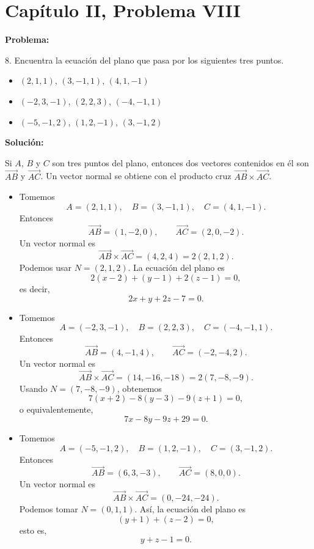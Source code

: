 \section*{Capítulo II, Problema VIII}

\textbf{Problema:}

8. Encuentra la ecuación del plano que pasa por los siguientes tres puntos.

\begin{itemize}
    \item[(a)] $(2,1,1)$, $(3,-1,1)$, $(4,1,-1)$
    \item[(b)] $(-2,3,-1)$, $(2,2,3)$, $(-4,-1,1)$
    \item[(c)] $(-5,-1,2)$, $(1,2,-1)$, $(3,-1,2)$
\end{itemize}

\textbf{Solución:}

Si $A$, $B$ y $C$ son tres puntos del plano, entonces dos vectores contenidos en él son $\overrightarrow{AB}$ y $\overrightarrow{AC}$. Un vector normal se obtiene con el producto cruz $\overrightarrow{AB} \times \overrightarrow{AC}$.

\begin{itemize}
    \item[(a)] Tomemos
    \[
        A=(2,1,1), \quad B=(3,-1,1), \quad C=(4,1,-1).
    \]
    Entonces
    \[
        \overrightarrow{AB} = (1,-2,0), \qquad \overrightarrow{AC} = (2,0,-2).
    \]
    Un vector normal es
    \[
        \overrightarrow{AB} \times \overrightarrow{AC} = (4,2,4) = 2(2,1,2).
    \]
    Podemos usar $N=(2,1,2)$. La ecuación del plano es
    \[
        2(x-2) + (y-1) + 2(z-1) = 0,
    \]
    es decir,
    \[
        2x + y + 2z - 7 = 0.
    \]

    \item[(b)] Tomemos
    \[
        A=(-2,3,-1), \quad B=(2,2,3), \quad C=(-4,-1,1).
    \]
    Entonces
    \[
        \overrightarrow{AB} = (4,-1,4), \qquad \overrightarrow{AC} = (-2,-4,2).
    \]
    Un vector normal es
    \[
        \overrightarrow{AB} \times \overrightarrow{AC} = (14,-16,-18) = 2(7,-8,-9).
    \]
    Usando $N=(7,-8,-9)$, obtenemos
    \[
        7(x+2) - 8(y-3) - 9(z+1) = 0,
    \]
    o equivalentemente,
    \[
        7x - 8y - 9z + 29 = 0.
    \]

    \item[(c)] Tomemos
    \[
        A=(-5,-1,2), \quad B=(1,2,-1), \quad C=(3,-1,2).
    \]
    Entonces
    \[
        \overrightarrow{AB} = (6,3,-3), \qquad \overrightarrow{AC} = (8,0,0).
    \]
    Un vector normal es
    \[
        \overrightarrow{AB} \times \overrightarrow{AC} = (0,-24,-24).
    \]
    Podemos tomar $N=(0,1,1)$. Así, la ecuación del plano es
    \[
        (y+1) + (z-2) = 0,
    \]
    esto es,
    \[
        y + z - 1 = 0.
    \]
\end{itemize}